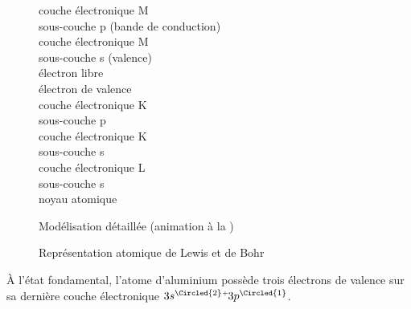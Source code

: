 \begin{center}
\begin{figure}[h]
\begin{minipage}{.69\linewidth}
\begin{annotate}
		\end{annotate} 
	\end{minipage}
\hfill
	\begin{minipage}{.28\linewidth}
couche électronique M\\sous-couche p (bande de conduction)\\
couche électronique M\\sous-couche s (valence) \\
électron libre\\
électron de valence\\
couche électronique K\\sous-couche p\\
couche électronique K\\sous-couche s\\
couche électronique L\\sous-couche s\\
noyau atomique
	\end{minipage}
	\caption{Modélisation détaillée (animation à la )}
	\label{fig:aluminium_modelisation}
\end{figure}
\end{center}

\begin{center}
\begin{figure}[h] %
	\begin{subfigure}[b]{.46\linewidth} %
	\centering %
	\label{fig:aluminium_lewis}
	\end{subfigure}
\hfill %
	\begin{subfigure}[b]{.46\linewidth} %
		\label{fig:aluminium_bohr}
	\end{subfigure}
	\caption{Représentation atomique de Lewis et de Bohr}
\end{figure}
\end{center}

\`A l'état fondamental, l'atome d'aluminium possède trois électrons de valence sur sa dernière couche électronique $3s^{\Circled{2}}\overset{\overset{+}{~}}{~}3p^{\Circled{1}}$. %


%

